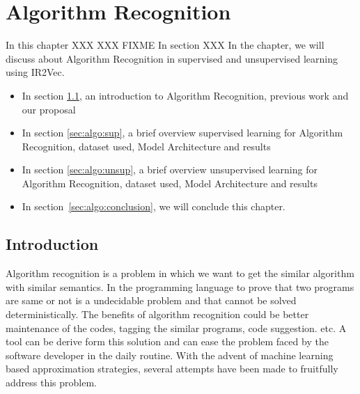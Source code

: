 \chapter{Algorithm Recognition}
\label{chap:ch3}

In this chapter XXX XXX FIXME In section XXX
In the chapter, we will discuss about Algorithm Recognition in supervised and unsupervised learning using IR2Vec.
\begin{itemize}
    
    \item In section \ref{sec:algo:intro}, an introduction to Algorithm Recognition, previous work and our proposal
    
    \item In section \ref{sec:algo:sup}, a brief overview supervised learning for Algorithm Recognition, dataset used, Model Architecture and results
    
    \item In section \ref{sec:algo:unsup}, a brief overview unsupervised learning for Algorithm Recognition, dataset used, Model Architecture and results  
    
    \item  In section~\ref{sec:algo:conclusion}, we will conclude this chapter.

\end{itemize}

\section{Introduction}\label{sec:algo:intro}
Algorithm recognition is a problem in which we want to get the similar algorithm with similar semantics. In the programming language to prove that two programs are same or not is a undecidable problem and that cannot be solved deterministically. The benefits of algorithm recognition could be better maintenance of the codes, tagging the similar programs, code suggestion. etc.   A tool can be derive form this solution and can ease the problem faced by the software developer in the daily routine. With the advent of machine learning based approximation strategies, several attempts have been made to fruitfully address this problem.


